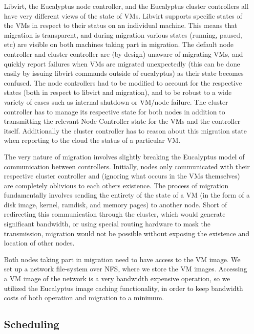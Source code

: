 Libvirt, the Eucalyptus node controller, and the Eucalyptus cluster controllers
all have very different views of the state of VMs.  Libvirt supports specific
states of the VMs in respect to their status on an individual machine. This
means that migration is transparent, and during migration various states
(running, paused, etc) are visible on both machines taking part in migration.
The default node controller and cluster controller are (by design) unaware of
migrating VMs, and quickly report failures when VMs are migrated unexpectedly
(this can be done easily by issuing libvirt commands outside of eucalyptus) as
their state becomes confused.  The node controllers had to be modified to
account for the respective states (both in respect to libvirt and migration),
and to be robust to a wide variety of cases such as internal shutdown or VM/node
failure.  The cluster controller has to manage its respective state for both
nodes in addition to transmitting the relevant Node Controller state for the VMs
and the controller itself.  Additionally the cluster controller has to reason
about this migration state when reporting to the cloud the status of a
particular VM.

The very nature of migration involves slightly breaking the Eucalyptus model of
communication between controllers.  Initially, nodes only communicated with
their respective cluster controller and (ignoring what occurs in the VMs
themselves) are completely oblivious to each others existence.  The process of
migration fundamentally involves sending the entirety of the state of a VM (in
the form of a disk image, kernel, ramdisk, and memory pages) to another node.
Short of redirecting this communication through the cluster, which would
generate significant bandwidth, or using special routing hardware to mask the
transmission, migration would not be possible without exposing the existence and
location of other nodes.

Both nodes taking part in migration need to have access to the VM image.  We set
up a network file-system over NFS, where we store the VM images.  Accessing a VM
image of the network is a very bandwidth expensive operation, so we utilized the
Eucalyptus image caching functionality, in order to keep bandwidth costs of both
operation and migration to a minimum.

\subsection{Scheduling}

